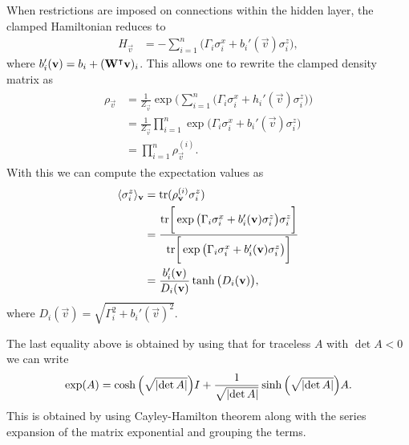 When restrictions are imposed on connections within the hidden layer, the clamped Hamiltonian reduces to
\begin{align}
    H_\vec{v}
        &= -\sum_{i=1}^{n} \big(\Gamma_i \sigma_i^x + b_i'(\vec{v}) \sigma_i^z\big),
\end{align}
where \( b_i'(\mathbf{v}) = b_i + (\mathbf{W}^\intercal\mathbf{v})_i \).
This allows one to rewrite the clamped density matrix as
\begin{align}
\begin{split}
    \rho_\vec{v}
        &= \frac{1}{Z_\vec{v}} \exp\bigg( \sum_{i=1}^{n} \big(\Gamma_i \sigma_i^x + h_i'(\vec{v}) \sigma_i^z\big) \bigg) \\
        &= \frac{1}{Z_\vec{v}} \prod_{i=1}^{n} \exp \big(\Gamma_i \sigma_i^x + b_i'(\vec{v}) \sigma_i^z\big) \\
        &= \prod_{i=1}^{n} \rho_\vec{v}^{(i)}.
\end{split}
\end{align}
With this we can compute the expectation values as
\begin{align}
\begin{split}
    \langle \sigma_i^z \rangle_{\mathbf{v}}
        &= \text{tr}(\rho_{\mathbf{v}}^{(i)}\sigma_i^z) \\
        &= \frac{\text{tr}\bigg[ \exp \big(\Gamma_i \sigma_i^x + b_i'(\mathbf{v}) \sigma_i^z\big) \sigma_i^z \bigg]}{\text{tr}\bigg[ \exp \big(\Gamma_i \sigma_i^x + b_i'(\mathbf{v}) \sigma_i^z\big) \bigg]} \\
        &= \frac{b_i'(\mathbf{v})}{D_i(\mathbf{v})} \tanh\big(D_i(\mathbf{v})\big),
\end{split}
\end{align}
where \( D_i(\vec{v}) = \sqrt{\Gamma_i^2 + b_i'(\vec{v})^2} \).

The last equality above is obtained by using that for traceless \( A \) with \( \det A < 0 \) we can write
\begin{align}
    \exp(A) = \cosh\Big(\sqrt{\lvert\det A\rvert}\Big) I + \frac{1}{\sqrt{\lvert\det A\rvert}}\sinh\Big(\sqrt{\lvert\det A\rvert}\Big) A.
\end{align}
This is obtained by using Cayley-Hamilton theorem along with the series expansion of the matrix exponential and grouping the terms.


